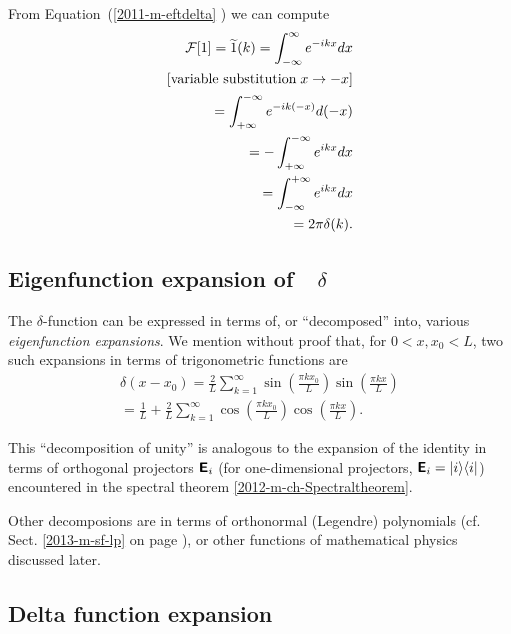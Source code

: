 From Equation~(\ref{2011-m-eftdelta} ) we can compute
\begin{equation}
\begin{split}
{\cal F}[1]=\widetilde{1}(k)=   \int_{-\infty}^\infty    e^{-i{kx}} dx   \\
 [\textrm{variable substitution}\; x \rightarrow -x]\\
 =   \int_{+\infty}^{-\infty}    e^{-i{k(-x)}} d(-x)   \\
 =  - \int_{+\infty}^{-\infty}    e^{i{kx}} dx   \\
 =    \int_{-\infty}^{+\infty}    e^{i{kx}} dx   \\
 =    2\pi \delta (k)
.
\end{split}
\label{2011-m-eftdelta1}
\end{equation}


\subsection{Eigenfunction expansion of~~$\delta$}
\label{2012-m-efed1}

The  $\delta$-function can be expressed  in terms of, or ``decomposed'' into, various
{\em eigenfunction expansions}.
We mention without proof\cite{duffy2001} that, for $0< x,x_0 <L$,
two such expansions in terms of trigonometric functions are
\begin{equation}
\begin{split}
\delta (x-x_0) =
\frac{2}{L}
\sum_{k=1}^\infty
\sin \left( \frac{\pi k x_0}{L}\right)
\sin \left( \frac{\pi k x}{L}\right)\\
  =
\frac{1}{L}
+
\frac{2}{L}
\sum_{k=1}^\infty
\cos \left( \frac{\pi k x_0}{L}\right)
\cos \left( \frac{\pi k x}{L}\right).
\end{split}
\label{2012-m-efed}
\end{equation}

This ``decomposition of unity'' is analogous to the expansion of the identity in terms of orthogonal projectors
$\textsf{\textbf{E}}_i$  (for one-dimensional projectors, $\textsf{\textbf{E}}_i=\vert i\rangle \langle i \vert $)
encountered in the spectral theorem \ref{2012-m-ch-Spectraltheorem}.

Other decomposions are in terms of orthonormal (Legendre) polynomials (cf. Sect. \ref{2013-m-sf-lp} on page \pageref{2013-m-sf-lp}),
or other functions of mathematical physics discussed later.

\subsection{Delta function expansion}
\label{2012-m-dfex}

